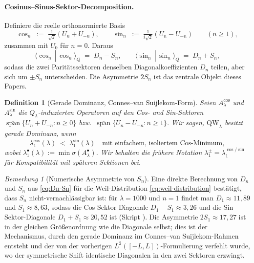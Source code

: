 \documentclass[11pt,a4paper]{article}
\newtheorem{definition}[definition]{Definition}
\theoremstyle{remark}
\newtheorem{remark}[remark]{Bemerkung}
\theoremstyle{plain}
\newcommand{\QW}{\mathrm{QW}}
\begin{document}
\paragraph{Cosinus--Sinus-Sektor-Decomposition.} Definiere die reelle orthonormierte Basis
\[
  \cos_n \;:=\; \tfrac{1}{\sqrt 2}(U_n + U_{-n}),
  \qquad
  \sin_n \;:=\; \tfrac{1}{i\sqrt 2}(U_n - U_{-n})
  \qquad (n\geq 1),
\]
zusammen mit $U_0$ für $n=0$. Daraus
\begin{equation}
\label{eq:cos-sin-diagonals}
  \langle \cos_n\,|\,\cos_n\rangle_Q \;=\; D_n - S_n,
  \qquad
  \langle \sin_n\,|\,\sin_n\rangle_Q \;=\; D_n + S_n,
\end{equation}
sodass die zwei Paritätssektoren denselben Diagonalkoeffizienten $D_n$ teilen, aber sich um $\pm S_n$ unterscheiden. Die Asymmetrie $2S_n$ ist das zentrale Objekt dieses Papers.

\begin{definition}[Gerade Dominanz, Connes--van Suijlekom-Form]
\label{def:even-dominance}
Seien $A_\lambda^{\cos}$ und $A_\lambda^{\sin}$ die $Q_\lambda$-induzierten Operatoren auf den Cos- und Sin-Sektoren $\overline{\operatorname{span}}\{U_n+U_{-n}:n\geq 0\}$ bzw.\ $\overline{\operatorname{span}}\{U_n-U_{-n}:n\geq 1\}$. Wir sagen, $\QW_\lambda$ besitzt \emph{gerade Dominanz}, wenn
\[
  \lambda_1^{\cos}(\lambda) \;<\; \lambda_1^{\sin}(\lambda)
  \quad\text{mit einfachem, isoliertem Cos-Minimum},
\]
wobei $\lambda_1^{\bullet}(\lambda):=\min\sigma(A_\lambda^{\bullet})$. Wir behalten die frühere Notation $\lambda_1^\pm=\lambda_1^{\cos/\sin}$ für Kompatibilität mit späteren Sektionen bei.
\end{definition}

\begin{remark}[Numerische Asymmetrie von $S_n$]
\label{rem:Sn-numerics}
Eine direkte Berechnung von $D_n$ und $S_n$ aus \eqref{eq:Dn-Sn} für die Weil-Distribution \eqref{eq:weil-distribution} bestätigt, dass $S_n$ nicht-vernachlässigbar ist: für $\lambda=1000$ und $n=1$ findet man $D_1\approx 11{,}89$ und $S_1\approx 8{,}63$, sodass die Cos-Sektor-Diagonale $D_1-S_1\approx 3{,}26$ und die Sin-Sektor-Diagonale $D_1+S_1\approx 20{,}52$ ist (Skript ). Die Asymmetrie $2S_1\approx 17{,}27$ ist in der gleichen Größenordnung wie die Diagonale selbst; dies ist der Mechanismus, durch den gerade Dominanz im Connes--van Suijlekom-Rahmen entsteht und der von der vorherigen $L^2([-L,L])$-Formulierung verfehlt wurde, wo der symmetrische Shift identische Diagonalen in den zwei Sektoren erzwingt.
\end{remark}
\end{document}
